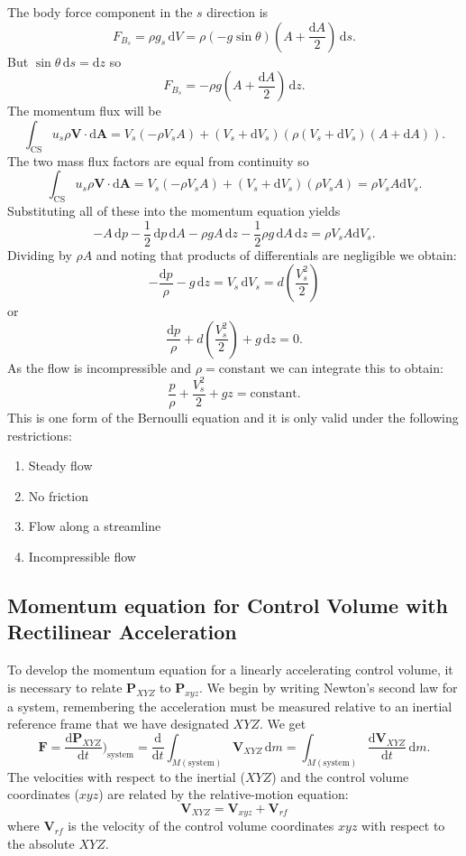 The body force component in the $s$ direction is
\[ 
F_{B_s} = \rho g_s \, \mathrm{d}V = \rho \left( -g \sin \theta \right) \left( A + \frac{\mathrm{d}A}{2} \right)\, \mathrm{d}s
.\]
But $\sin \theta \, \mathrm{d}s = \mathrm{d}z$ so
\[ 
F_{B_s} = - \rho g \left( A + \frac{\mathrm{d}A}{2} \right)\, \mathrm{d}z
.\]
The momentum flux will be
\[ 
\int_{\mathrm{CS}} u_s \rho \textbf{V} \cdot \mathrm{d}\textbf{A} = V_s \left( - \rho V_s A \right) + \left( V_s + \mathrm{d}V_s \right) \left( \rho \left( V_s + \mathrm{d}V_s \right) \left( A + \mathrm{d}A \right) \right)
.\]
The two mass flux factors are equal from continuity so
\[ 
\int_{\mathrm{CS}} u_s \rho \textbf{V} \cdot \mathrm{d}\textbf{A} = V_s \left( - \rho V_s A \right) + \left( V_s + \mathrm{d}V_s \right) \left( \rho V_s A \right) = \rho V_s A \mathrm{d}V_s 
.\]
Substituting all of these into the momentum equation yields
\[ 
- A \, \mathrm{d}p - \frac{1}{2} \, \mathrm{d}p \, \mathrm{d}A - \rho g A \, \mathrm{d}z - \frac{1}{2} \rho g \, \mathrm{d}A \, \mathrm{d}z = \rho V_s A \mathrm{d}V_s
.\]
Dividing by $\rho A$ and noting that products of differentials are negligible we obtain:
\[ 
- \frac{\mathrm{d}p}{\rho} - g \, \mathrm{d}z = V_s \, \mathrm{d}V_s = d \left( \frac{V_s^2}{2} \right)
\]
or
\[ 
  \frac{\mathrm{d}p}{\rho} + d \left( \frac{V_s^2}{2} \right) + g \, \mathrm{d}z = 0
.\]
As the flow is incompressible and $\rho = \mathrm{constant}$ we can integrate this to obtain:
\[ 
\frac{p}{\rho} + \frac{V_s^2}{2} + gz = \mathrm{constant}
.\]
This is one form of the Bernoulli equation and it is only valid under the following restrictions:
\begin{enumerate}
  \item Steady flow
  \item No friction
  \item Flow along a streamline
  \item Incompressible flow
\end{enumerate}


\subsection{Momentum equation for Control Volume with Rectilinear Acceleration}
To develop the momentum equation for a linearly accelerating control volume, it is necessary to relate $\textbf{P}_{XYZ}$ to $\textbf{P}_{xyz}$. We begin by writing Newton's second law for a system, remembering the acceleration must be measured relative to an inertial reference frame that we have designated $XYZ$. We get
\[ 
\textbf{F} = \frac{\mathrm{d}\textbf{P}_{XYZ}}{\mathrm{d}t} \bigg)_{\mathrm{system}} = \frac{\mathrm{d}}{\mathrm{d}t} \int_{M (\mathrm{system})} \textbf{V}_{XYZ} \, \mathrm{d}m = \int_{M (\mathrm{system})} \frac{\mathrm{d}\textbf{V}_{XYZ}}{\mathrm{d}t} \, \mathrm{d}m
.\]
The velocities with respect to the inertial ($XYZ$) and the control volume coordinates ($xyz$) are related by the relative-motion equation:
\[ 
\textbf{V}_{XYZ} = \textbf{V}_{xyz} + \textbf{V}_{rf}
\]
where $\textbf{V}_{rf}$ is the velocity of the control volume coordinates $xyz$ with respect to the absolute $XYZ$. 

